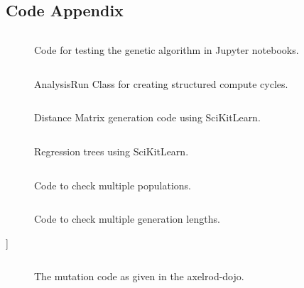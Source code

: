 \begin{appendices}
    \chapter{Code Appendix}\label{apndx:code}
    \begin{figure}[ht]
        \inputminted[fontsize=\small]{python}{./code_snippets/appendix/runGeneticAlgo.py}
        \caption{Code for testing the genetic algorithm in Jupyter notebooks.}\label{apcode:runGeneticAlgo.py}
    \end{figure}

    \begin{figure}[ht]
        \inputminted[fontsize=\small]{python}{./code_snippets/appendix/AnalysisRun.py}
        \caption{AnalysisRun Class for creating structured compute cycles.}\label{apcode:AnalysisRun.py}
    \end{figure}

    \begin{figure}[ht]
        \inputminted[fontsize=\small]{python}{./code_snippets/appendix/dist_matrix.py}
        \caption{Distance Matrix generation code using SciKitLearn.}\label{apcode:dist_matrix.py}
    \end{figure}

    \begin{figure}[ht]
        \inputminted[fontsize=\small]{python}{./code_snippets/appendix/reg_tree.py}
        \caption{Regression trees using SciKitLearn.}\label{apcode:reg_tree.py}
    \end{figure}

    \begin{figure}
        \inputminted[fontsize=\small]{python}{code_snippets/populationChecker.py}
        \caption{Code to check multiple populations.}\label{apcode:populationChecker.py}
    \end{figure}

    \begin{figure}
        \inputminted{python}{code_snippets/generationChecker.py}
        \caption{Code to check multiple generation lengths.}\label{apcode:generationChecker.py}
    \end{figure}]

    \begin{figure}
        \inputminted{python}{code_snippets/mutateFromDojo.py}
        \caption{The mutation code as given in the axelrod-dojo.}
        \label{apcode:mutateFromDojo}
    \end{figure}
    

\end{appendices}
